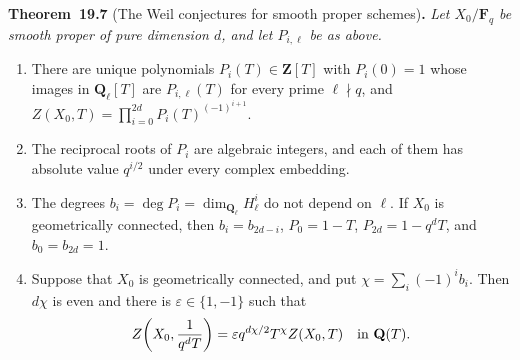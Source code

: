 \documentclass[11pt]{article}
\newenvironment{bpstatement}[2]{\par\addvspace{0.6\baselineskip}\noindent\textbf{#1}#2\textbf{.}\enspace\ignorespaces}
  {\par\addvspace{0.4\baselineskip}}
\newenvironment{bpstatementit}[2]{\begin{bpstatement}{#1}{#2}\itshape\ignorespaces}{\end{bpstatement}}
\begin{document}
\label{bp24}%
\begin{bpstatementit}{Theorem~19.7}{ (The Weil conjectures for smooth proper schemes)}
Let \(X_0/\mathbf F_q\) be smooth proper of pure dimension \(d\), and let \(P_{i,\ell}\) be as above.

\begin{enumerate}
\item There are unique polynomials \(P_i(T)\in\mathbf Z[T]\) with \(P_i(0)=1\) whose images in \(\mathbf Q_\ell[T]\) are \(P_{i,\ell}(T)\) for every prime \(\ell\nmid q\), and \(Z(X_0,T)=\prod_{i=0}^{2d}P_i(T)^{(-1)^{i+1}}\).
\item The reciprocal roots of \(P_i\) are algebraic integers, and each of them has absolute value \(q^{i/2}\) under every complex embedding.
\item The degrees \(b_i=\deg P_i=\dim_{\mathbf Q_\ell}H^i_\ell\) do not depend on \(\ell\). If \(X_0\) is geometrically connected, then \(b_i=b_{2d-i}\), \(P_0=1-T\), \(P_{2d}=1-q^dT\), and \(b_0=b_{2d}=1\).
\item Suppose that \(X_0\) is geometrically connected, and put \(\chi=\sum_i(-1)^ib_i\). Then \(d\chi\) is even and there is \(\varepsilon\in\{1,-1\}\) such that \[
   Z\!\left(X_0,\frac1{q^dT}\right)
   =\varepsilon q^{d\chi/2}T^\chi Z(X_0,T)
   \quad\hbox{in }\mathbf Q(T).
   \]
\end{enumerate}
\end{bpstatementit}
\end{document}
